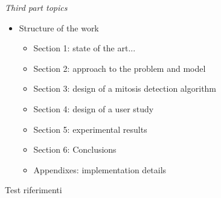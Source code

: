 \emph{Third part topics}

\begin{itemize}
\item Structure of the work
	\begin{itemize}
	\item Section 1: state of the art...
	\item Section 2: approach to the problem and model
	\item Section 3: design of a mitosis detection algorithm
	\item Section 4: design of a user study
	\item Section 5: experimental results
	\item Section 6: Conclusions
	\item Appendixes: implementation details
	\end{itemize}
\end{itemize}








Test riferimenti \cite{HTF}